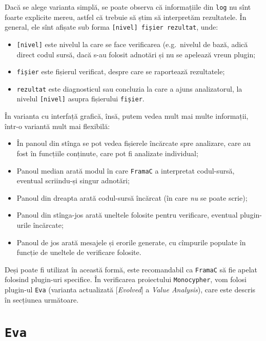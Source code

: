 Dacă se alege varianta simplă, se poate observa că informațiile din \texttt{log}
nu sînt foarte explicite mereu, astfel că trebuie să știm să interpretăm rezultatele.
În general, ele sînt afișate sub forma \texttt{[nivel] fișier rezultat}, unde:
\begin{itemize}
\item \texttt{[nivel]} este nivelul la care se face verificarea (e.g.\ nivelul de bază, adică
direct codul sursă, dacă s-au folosit adnotări și nu se apelează vreun plugin;
\item \texttt{fișier} este fișierul verificat, despre care se raportează rezultatele;
\item \texttt{rezultat} este diagnosticul sau concluzia la care a ajuns analizatorul,
  la nivelul \texttt{[nivel]} asupra fișierului \texttt{fișier}.
\end{itemize}


În varianta cu interfață grafică, însă, putem vedea mult mai multe informații, într-o
variantă mult mai flexibilă:
\begin{itemize}
\item În panoul din stînga se pot vedea fișierele încărcate spre analizare, care au fost
   în funcțiile conținute, care pot fi analizate individual;
\item Panoul median arată modul în care \texttt{FramaC} a interpretat codul-sursă,
  eventual scriindu-și singur adnotări;
\item Panoul din dreapta arată codul-sursă încărcat (în care \emph{nu} se poate scrie);
\item Panoul din stînga-jos arată uneltele folosite pentru verificare, eventual
  plugin-urile încărcate;
\item Panoul de jos arată mesajele și erorile generate, cu cîmpurile populate în
  funcție de uneltele de verificare folosite.
\end{itemize}

Deși poate fi utilizat în această formă, este recomandabil ca \texttt{FramaC} să fie
apelat folosind plugin-uri specifice. În verificarea proiectului \texttt{Monocypher},
vom folosi plugin-ul \texttt{Eva} (varianta actualizată [\emph{Evolved}] a
\emph{Value Analysis}), care este descris în secțiunea următoare.



\section{\texttt{Eva}}

